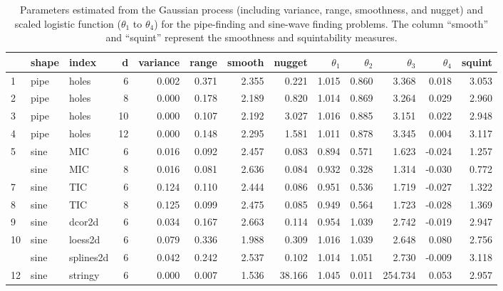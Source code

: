 \documentclass[
  number,
  preprint,
  3p]{elsarticle}
\begin{document}
\hypertarget{tbl-smoothness-squintability}{}
\begin{table}
\caption{\label{tbl-smoothness-squintability}Parameters estimated from the Gaussian process (including variance,
range, smoothness, and nugget) and scaled logistic function
(\(\theta_1\) to \(\theta_4\)) for the pipe-finding and sine-wave
finding problems. The column ``smooth'' and ``squint'' represent the
smoothness and squintability measures. }\tabularnewline

\centering\begingroup\fontsize{7}{9}\selectfont

\begin{tabular}{|>{}lll>{}r|rrr>{}r|rrrr>{}r|}
\toprule
  & shape & index & d & variance & range & smooth & nugget & $\theta_1$ & $\theta_2$ & $\theta_3$ & $\theta_4$ & squint\\
\midrule
1 & pipe & holes & 6 & 0.002 & 0.371 & 2.355 & 0.221 & 1.015 & 0.860 & 3.368 & 0.018 & 3.053\\
2 & pipe & holes & 8 & 0.000 & 0.178 & 2.189 & 0.820 & 1.014 & 0.869 & 3.264 & 0.029 & 2.960\\
3 & pipe & holes & 10 & 0.000 & 0.107 & 2.192 & 3.027 & 1.016 & 0.885 & 3.151 & 0.022 & 2.948\\
4 & pipe & holes & 12 & 0.000 & 0.148 & 2.295 & 1.581 & 1.011 & 0.878 & 3.345 & 0.004 & 3.117\\
5 & sine & MIC & 6 & 0.016 & 0.092 & 2.457 & 0.083 & 0.894 & 0.571 & 1.623 & -0.024 & 1.257\\
\addlinespace
6 & sine & MIC & 8 & 0.016 & 0.081 & 2.636 & 0.084 & 0.932 & 0.328 & 1.314 & -0.030 & 0.772\\
7 & sine & TIC & 6 & 0.124 & 0.110 & 2.444 & 0.086 & 0.951 & 0.536 & 1.719 & -0.027 & 1.322\\
8 & sine & TIC & 8 & 0.125 & 0.099 & 2.475 & 0.085 & 0.949 & 0.564 & 1.723 & -0.028 & 1.369\\
9 & sine & dcor2d & 6 & 0.034 & 0.167 & 2.663 & 0.114 & 0.954 & 1.039 & 2.742 & -0.019 & 2.947\\
10 & sine & loess2d & 6 & 0.079 & 0.336 & 1.988 & 0.309 & 1.016 & 1.039 & 2.648 & 0.080 & 2.756\\
\addlinespace
11 & sine & splines2d & 6 & 0.042 & 0.242 & 2.537 & 0.102 & 1.014 & 1.051 & 2.730 & -0.009 & 3.118\\
12 & sine & stringy & 6 & 0.000 & 0.007 & 1.536 & 38.166 & 1.045 & 0.011 & 254.734 & 0.053 & 2.957\\
\bottomrule
\end{tabular}
\endgroup{}
\end{table}
\end{document}
